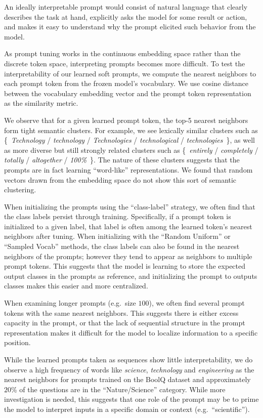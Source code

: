 \documentclass[11pt]{article}
\begin{document}
An ideally interpretable prompt would consist of natural language that clearly describes the task at hand, explicitly asks the model for some result or action, and makes it easy to understand why the prompt elicited such behavior from the model.

As prompt tuning works in the continuous embedding space rather than the discrete token space, interpreting prompts becomes more difficult. To test the interpretability of our learned soft prompts, we compute the nearest neighbors to each prompt token from the frozen model's vocabulary. We use cosine distance between the vocabulary embedding vector and the prompt token representation as the similarity metric.

We observe that for a given learned prompt token, the top-5 nearest neighbors form tight semantic clusters. For example, we see lexically similar clusters such as \{~\textit{Technology} / \textit{technology} / \textit{Technologies} / \textit{technological} / \textit{technologies}~\}, as well as more diverse but still strongly related clusters such as \{~\textit{entirely} / \textit{completely} / \textit{totally} / \textit{altogether} / \textit{100\%}~\}. The nature of these clusters suggests that the prompts are in fact learning ``word-like'' representations. We found that random vectors drawn from the embedding space do not show this sort of semantic clustering.

When initializing the prompts using the ``class-label'' strategy, we often find that the class labels persist through training. Specifically, if a prompt token is initialized to a given label, that label is often among the learned token's nearest neighbors after tuning. When initializing with the ``Random Uniform'' or ``Sampled Vocab'' methods, the class labels can also be found in the nearest neighbors of the prompts; however they tend to appear as neighbors to multiple prompt tokens. This suggests that the model is learning to store the expected output classes in the prompts as reference, and initializing the prompt to outputs classes makes this easier and more centralized.

When examining longer prompts (e.g.~size $100$), we often find several prompt tokens with the same nearest neighbors. This suggests there is either excess capacity in the prompt, or that the lack of sequential structure in the prompt representation makes it difficult for the model to localize information to a specific position.

While the learned prompts taken as sequences show little interpretability, we do observe a high frequency of words like \textit{science}, \textit{technology} and \textit{engineering} as the nearest neighbors for prompts trained on the BoolQ dataset and approximately $20$\% of the questions are in the ``Nature/Science'' category. While more investigation is needed, this suggests that one role of the prompt may be to prime the model to interpret inputs in a specific domain or context (e.g.~``scientific'').
\end{document}
